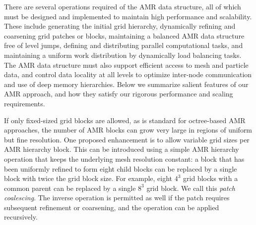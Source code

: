 \documentclass[11pt,letterpaper]{article}
\begin{document}


There are several operations required of the AMR data structure, all
of which must be designed and implemented to maintain high performance
and scalability.  These include generating the initial grid hierarchy,
dynamically refining and coarsening grid patches or blocks,
maintaining a balanced AMR data structure free of level jumps,
defining and distributing parallel computational tasks, and
maintaining a uniform work distribution by dynamically load balancing
tasks.  The AMR data structure must also support efficient access to
mesh and particle data, and control data locality at all levels to
optimize inter-node communication and use of deep memory hierarchies.
Below we summarize salient features of our AMR approach, and how they
satisfy our rigorous performance and scaling requirements.


%
If only fixed-sized grid blocks are allowed, as is standard for octree-based AMR
approaches, the number of AMR blocks
can grow very large in regions of uniform but fine resolution.  One proposed enhancement is to allow variable
grid sizes per AMR hierarchy block.  This can be introduced using a
simple AMR hierarchy operation that keeps the
underlying mesh resolution
constant: a block that has been uniformly refined to form eight child blocks
can be replaced by a single block with twice the grid block size.  For example,
eight $4^3$ grid blocks with a common parent can be replaced by a single
$8^3$ grid block.  We call this \textit{patch
  coalescing}.  The inverse operation is permitted as well if the
patch requires subsequent refinement or coarsening, and the operation can be applied recursively.
\end{document}
